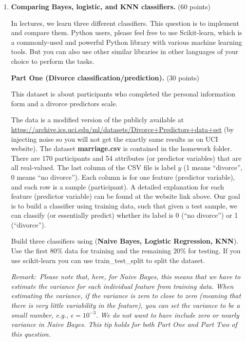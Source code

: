 \documentclass[twoside,10pt]{article}
\begin{document}
\begin{enumerate}
\begin{enumerate}
\end{enumerate}
 
\item {\bf Comparing Bayes, logistic, and KNN classifiers.} (60 points)

In lectures, we learn three different classifiers. This question is to implement and compare them. Python users, please feel free to use \textsf{Scikit-learn}, which is a commonly-used and powerful \textsf{Python} library with various machine learning tools. But you can also use other similar libraries in other languages of your choice to perform the tasks. 


\textbf{Part One (Divorce classification/prediction).} (30 points) 

This dataset is about participants who completed the personal information form and a divorce predictors scale. 

The data is a modified version of the publicly available at \\ \url{https://archive.ics.uci.edu/ml/datasets/Divorce+Predictors+data+set} (by injecting noise so you will not get the exactly same results as on UCI website).  The dataset \textbf{marriage.csv} is contained in the homework folder. There are 170 participants and 54 attributes (or predictor variables) that are all real-valued. The last column of the CSV file is label $y$ (1 means ``divorce'', 0 means ``no divorce''). Each column is for one feature (predictor variable), and each row is a sample (participant). A detailed explanation for each feature (predictor variable) can be found at the website link above. Our goal is to build a classifier using training data, such that given a test sample, we can classify (or essentially predict) whether its label is 0 (``no divorce'') or 1 (``divorce''). 

Build three classifiers using ({\bf Naive Bayes, Logistic Regression, KNN}). Use the first $80\%$ data for training and the remaining $20\%$ for testing. If you use \textsf{scikit-learn} you can use \textsf{train\_test\_split} to split the dataset. 

\textit{Remark: Please note that, here, for Naive Bayes, this means that we have to estimate the variance for each individual feature from training data. When estimating the variance, if the variance is zero to close to zero (meaning that there is very little variability in the feature), you can set the variance to be a small number, e.g., $\epsilon = 10^{-3}$. We do not want to have include zero or nearly variance in Naive Bayes. This tip holds for both Part One and Part Two of this question.}


\end{enumerate}
\end{document}
